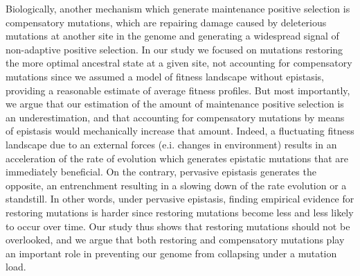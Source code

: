 \documentclass{article}
\begin{document}
    Biologically, another mechanism which generate maintenance positive selection is compensatory mutations, which are repairing damage caused by deleterious mutations at another site in the genome and generating a widespread signal of non-adaptive positive selection\cite{hartl_compensatory_1996, pollock_strong_2014, starr_epistasis_2016}.
    In our study we focused on mutations restoring the more optimal ancestral state at a given site, not accounting for compensatory mutations since we assumed a model of fitness landscape without epistasis, providing a reasonable estimate of average fitness profiles\cite{youssef_consequences_2020}.
    But most importantly, we argue that our estimation of the amount of maintenance positive selection is an underestimation, and that accounting for compensatory mutations by means of epistasis would mechanically increase that amount.
    Indeed, a fluctuating fitness landscape due to an external forces (e.i. changes in environment) results in an acceleration of the rate of evolution\cite{ rodrigue_detecting_2017, rodrigue_bayesian_2021} which generates epistatic mutations that are immediately beneficial\cite{gong_epistatically_2014}.
    On the contrary, pervasive epistasis generates the opposite, an entrenchment\cite{goldstein_evolutionary_2004, goldstein_nonadaptive_2015} resulting in a slowing down of the rate evolution\cite{rodrigue_detecting_2017, patel_epistasis_2022} or a standstill\cite{youssef_evolution_2022}.
    In other words, under pervasive epistasis, finding empirical evidence for restoring mutations is harder since restoring mutations become less and less likely to occur over time\cite{goldstein_nonadaptive_2015, goldstein_sequence_2017, park_epistatic_2022}.
    Our study thus shows that restoring mutations should not be overlooked, and we argue that both restoring and compensatory mutations play an important role in preventing our genome from collapsing under a mutation load.

\end{document}

